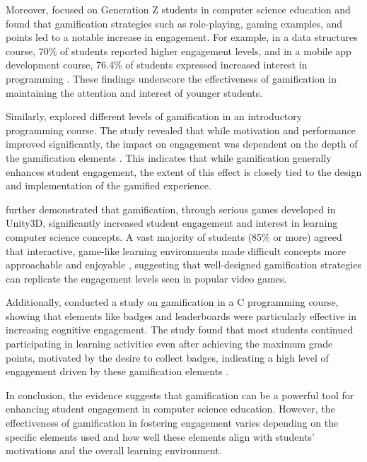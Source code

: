 \documentclass[sigconf,review]{acmart} %
\begin{document}
Moreover, \citet{Mohammed_Jawad2021} focused on Generation Z students in computer science education and found that gamification strategies such as role-playing, gaming examples, and points led to a notable increase in engagement. For example, in a data structures course, 70\% of students reported higher engagement levels, and in a mobile app development course, 76.4\% of students expressed increased interest in programming \cite{Mohammed_Jawad2021}. These findings underscore the effectiveness of gamification in maintaining the attention and interest of younger students.

Similarly, \citet{Imran2022} explored different levels of gamification in an introductory programming course. The study revealed that while motivation and performance improved significantly, the impact on engagement was dependent on the depth of the gamification elements \cite{Imran2022}. This indicates that while gamification generally enhances student engagement, the extent of this effect is closely tied to the design and implementation of the gamified experience.

\citet{Butler2016} further demonstrated that gamification, through serious games developed in Unity3D, significantly increased student engagement and interest in learning computer science concepts. A vast majority of students (85\% or more) agreed that interactive, game-like learning environments made difficult concepts more approachable and enjoyable \cite{Butler2016}, suggesting that well-designed gamification strategies can replicate the engagement levels seen in popular video games.

Additionally, \citet{Ibanez2014} conducted a study on gamification in a C programming course, showing that elements like badges and leaderboards were particularly effective in increasing cognitive engagement. The study found that most students continued participating in learning activities even after achieving the maximum grade points, motivated by the desire to collect badges, indicating a high level of engagement driven by these gamification elements \cite{Ibanez2014}.

In conclusion, the evidence suggests that gamification can be a powerful tool for enhancing student engagement in computer science education. However, the effectiveness of gamification in fostering engagement varies depending on the specific elements used and how well these elements align with students' motivations and the overall learning environment.
\end{document}

